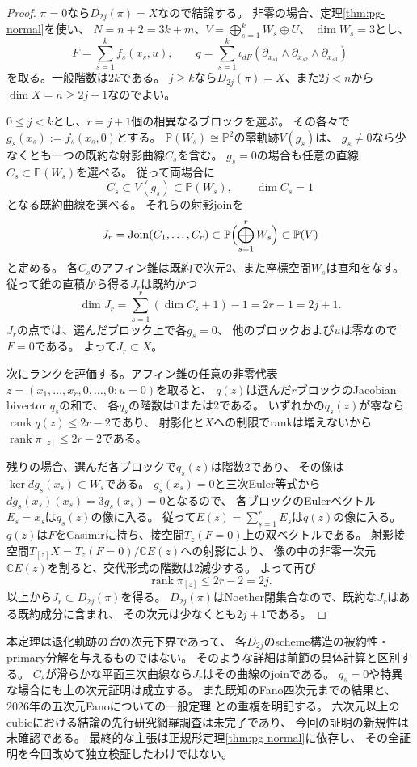 \begin{proof}
$\pi=0$なら$D_{2j}(\pi)=X$なので結論する。
非零の場合、定理\ref{thm:pg-normal}を使い、
$N=n+2=3k+m$、$V=\bigoplus_{s=1}^kW_s\oplus U$、
$\dim W_s=3$とし、
\[
 F=\sum_{s=1}^kf_s(x_s,u),\qquad
 q=\sum_{s=1}^k
 \iota_{dF}
 (\partial_{x_{s1}}\wedge\partial_{x_{s2}}
  \wedge\partial_{x_{s3}})
\]
を取る。一般階数は$2k$である。
$j\ge k$なら$D_{2j}(\pi)=X$、また$2j<n$から
$\dim X=n\ge2j+1$なのでよい。

$0\le j<k$とし、$r=j+1$個の相異なるブロックを選ぶ。
その各々で$g_s(x_s):=f_s(x_s,0)$とする。
$\mathbb P(W_s)\cong\mathbb P^2$の零軌跡$V(g_s)$は、
$g_s\ne0$なら少なくとも一つの既約な射影曲線$C_s$を含む。
$g_s=0$の場合も任意の直線$C_s\subset\mathbb P(W_s)$を選べる。
従って両場合に
\[
 C_s\subset V(g_s)\subset\mathbb P(W_s),\qquad
 \dim C_s=1
\]
となる既約曲線を選べる。
それらの射影joinを
\[
 J_r=\operatorname{Join}(C_1,\ldots,C_r)
       \subset\mathbb P\Bigl(\bigoplus_{s=1}^r W_s\Bigr)
       \subset\mathbb P(V)
\]
と定める。
各$C_s$のアフィン錐は既約で次元2、また座標空間$W_s$は直和をなす。
従って錐の直積から得る$J_r$は既約かつ
\[
 \dim J_r=\sum_{s=1}^r(\dim C_s+1)-1=2r-1=2j+1.
\]
$J_r$の点では、選んだブロック上で各$g_s=0$、
他のブロックおよび$u$は零なので$F=0$である。
よって$J_r\subset X$。

次にランクを評価する。アフィン錐の任意の非零代表
$z=(x_1,\ldots,x_r,0,\ldots,0;u=0)$を取ると、
$q(z)$は選んだ$r$ブロックのJacobian bivector $q_s$の和で、
各$q_s$の階数は0または2である。
いずれかの$q_s(z)$が零なら
$\operatorname{rank}q(z)\le2r-2$であり、
射影化と$X$への制限でrankは増えないから
$\operatorname{rank}\pi_{[z]}\le2r-2$である。

残りの場合、選んだ各ブロックで$q_s(z)$は階数2であり、
その像は$\ker dg_s(x_s)\subset W_s$である。
$g_s(x_s)=0$と三次Euler等式から
$dg_s(x_s)(x_s)=3g_s(x_s)=0$となるので、
各ブロックのEulerベクトル$E_s=x_s$は$q_s(z)$の像に入る。
従って$E(z)=\sum_{s=1}^r E_s$は$q(z)$の像に入る。
$q(z)$は$F$をCasimirに持ち、接空間$T_z(F=0)$上の双ベクトルである。
射影接空間$T_{[z]}X=T_z(F=0)/\mathbb CE(z)$への射影により、
像の中の非零一次元$\mathbb CE(z)$を割ると、交代形式の階数は2減少する。
よって再び
\[
 \operatorname{rank}\pi_{[z]}\le2r-2=2j.
\]
以上から$J_r\subset D_{2j}(\pi)$を得る。
$D_{2j}(\pi)$はNoether閉集合なので、既約な$J_r$はある既約成分に含まれ、
その次元は少なくとも$2j+1$である。
\end{proof}

\begin{remark}[証明の適用範囲と既存の退化スキーム計算]
\label{rem:pg-bondal-scope}
本定理は退化軌跡の\emph{台}の次元下界であって、
各$D_{2j}$のscheme構造の被約性・primary分解を与えるものではない。
そのような詳細は前節の具体計算と区別する。
$C_s$が滑らかな平面三次曲線なら$J_r$はその曲線のjoinである。
$g_s=0$や特異な場合にも上の次元証明は成立する。
また既知のFano四次元までの結果と、
2026年の五次元Fanoについての一般定理
\cite{BondalDruelPereiraPymTouzet}との重複を明記する。
六次元以上のcubicにおける結論の先行研究網羅調査は未完了であり、
今回の証明の新規性は未確認である。
最終的な主張は正規形定理\ref{thm:pg-normal}に依存し、
その全証明を今回改めて独立検証したわけではない。
\end{remark}
